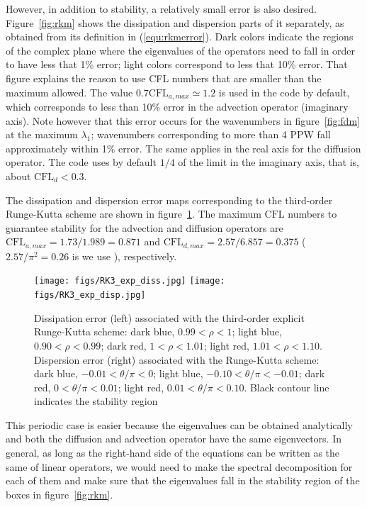 {However, in addition to stability, a relatively small error is also
desired. Figure~\ref{fig:rkm} shows the dissipation and dispersion parts of it
separately, as obtained from its definition in (\ref{equ:rkmerror}). Dark colors
indicate the regions of the complex plane where the eigenvalues of the operators
need to fall in order to have less that 1\% error; light colors correspond to
less that 10\% error. That figure explains the reason to use CFL numbers that
are smaller than the maximum allowed. The value $0.7\textrm{CFL}_{a,max}\simeq
1.2$ is used in the code by default, which corresponds to less than 10\% error
in the advection operator (imaginary axis). Note however that this error occurs
for the wavenumbers in figure~\ref{fig:fdm} at the maximum $\lambda_1$;
wavenumbers corresponding to more than 4 PPW fall approximately within 1\%
error. The same applies in the real axis for the diffusion operator. The code
uses by default $1/4$ of the limit in the imaginary axis, that is, about
$\textrm{CFL}_{d}<0.3$.

The dissipation and dispersion error maps corresponding to the third-order
Runge-Kutta scheme are shown in figure~\ref{fig:rkm3}. The maximum $\mathrm{CFL}$ numbers
to guarantee stability for the advection and diffusion operators are
$\textrm{CFL}_{a,max} = 1.73/1.989=0.871$ and $\textrm{CFL}_{d,max} =
2.57/6.857=0.375$ ($2.57/\pi^2=0.26$ is we use \cite{Lamballais:2011}), respectively.

\begin{figure}
\texttt{[image: figs/RK3\_exp\_diss.jpg]}\hfill
\texttt{[image: figs/RK3\_exp\_disp.jpg]}
\caption{Dissipation error (left) associated with the third-order explicit
  Runge-Kutta scheme: dark blue, $0.99<\rho<1$; light blue, $0.90<\rho<0.99$;
  dark red, $1<\rho<1.01$; light red, $1.01<\rho<1.10$. Dispersion error (right)
  associated with the Runge-Kutta scheme: dark blue, $-0.01<\theta/\pi<0$; light
  blue, $-0.10<\theta/\pi<-0.01$; dark red, $0<\theta/\pi<0.01$; light red,
  $0.01<\theta/\pi<0.10$. Black contour line indicates the stability
  region}\label{fig:rkm3}
\end{figure}

This periodic case is easier because the eigenvalues can be obtained
analytically and both the diffusion and advection operator have the same
eigenvectors. In general, as long as the right-hand side of the equations can be
written as the same of linear operators, we would need to make the spectral
decomposition for each of them and make sure that the eigenvalues fall in the
stability region of the boxes in figure~\ref{fig:rkm}.

}
